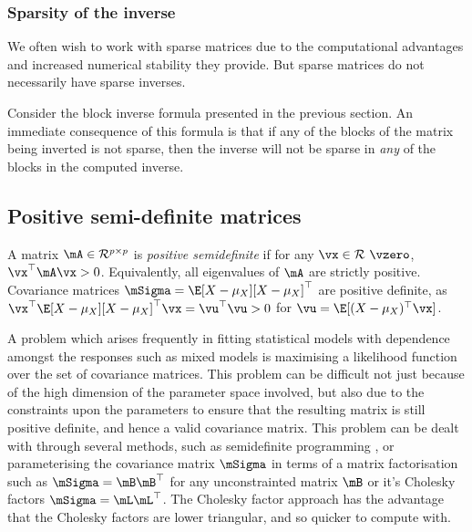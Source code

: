 \subsubsection{Sparsity of the inverse}
We often wish to work with sparse matrices due to the computational advantages and increased numerical
stability they provide. But sparse matrices do not necessarily have sparse inverses. 

Consider the block inverse formula presented in the previous section. An immediate consequence of this formula
is that if any of the blocks of the matrix being inverted is not sparse, then the inverse will not be sparse
in \emph{any} of the blocks in the computed inverse.

\subsection{Positive semi-definite matrices}
A matrix $\mA \in \mathcal{R}^{p \times p}$ is \emph{positive semidefinite} if for any $\vx \in \mathcal{R} \ \vzero$,
$\vx^\top \mA \vx > 0$. Equivalently, all eigenvalues of $\mA$ are strictly positive. Covariance matrices
$\mSigma = \E[X - \mu_X][X - \mu_X]^\top$ are positive definite, as
$\vx^\top \E[X - \mu_X][X - \mu_X]^\top \vx = \vu^\top \vu > 0$ for $\vu = \E[(X - \mu_X)^\top \vx]$.

A problem which arises frequently in fitting statistical models with dependence amongst the responses such as mixed
models is maximising a likelihood function over the set of covariance matrices. This problem can be difficult not
just because of the high dimension of the parameter space involved, but also due to the constraints upon the
parameters to ensure that the resulting matrix is still positive definite, and hence a valid covariance matrix. This
problem can be dealt with through several methods, such as semidefinite programming \citep{Boyd2010}, or parameterising the covariance
matrix $\mSigma$ in terms of a matrix factorisation such as
$\mSigma = \mB \mB^\top$ for any unconstrainted matrix $\mB$ or it's Cholesky factors $\mSigma = \mL \mL^\top$.
The Cholesky factor approach has the advantage that the Cholesky factors are lower triangular, and so quicker to
compute with.
